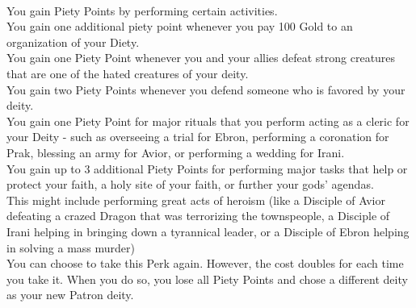 \\
You gain Piety Points by performing certain activities.\\
You gain one additional piety point whenever you pay 100 Gold to an organization of your Diety.\\
You gain one Piety Point whenever you and your allies defeat strong creatures that are one of the hated creatures of your deity.\\
You gain two Piety Points whenever you defend someone who is favored by your deity.\\
You gain one Piety Point for major rituals that you perform acting as a cleric for your Deity - such as overseeing a trial for Ebron, performing a coronation for Prak, blessing an army for Avior, or performing a wedding for Irani.\\
You gain up to 3 additional Piety Points for performing major tasks that help or protect your faith, a holy site of your faith, or further your gods' agendas.\\
This might include performing great acts of heroism (like a Disciple of Avior defeating a crazed Dragon that was terrorizing the townspeople, a Disciple of Irani helping in bringing down a tyrannical leader, or a Disciple of Ebron helping in solving a mass murder)
\\
You can choose to take this Perk again.
However, the cost doubles for each time you take it.
When you do so, you lose all Piety Points and chose a different deity as your new Patron deity.
